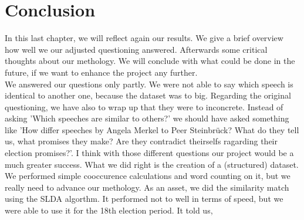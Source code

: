 \documentclass[12pt,paper=a4,nenglish]{scrreprt}
\begin{document}
\chapter{Conclusion}
In this last chapter, we will reflect again our results. We give a brief
overview how well we our adjusted questioning answered. Afterwards some critical
thoughts about our methology. We will conclude with what could be done in the
future, if we want to enhance the project any further.\\
We answered our questions only partly. We were not able to say which speech is
identical to another one, because the dataset was to big. 
Regarding the original questioning, we have also to wrap up that they were 
to inconcrete. Instead of asking 'Which speeches are similar to others?' we should have asked something like 'How differ speeches by Angela Merkel to Peer
Steinbrück? What do they tell us, what promises they make? Are they contradict
theirselfs ragarding their election promises?'. I think with those different
questions our project would be a much greater success. What we did right is the creation of a
(structured) dataset. We performed simple cooccurence calculations and word
counting on it, but we really need to advance our methology. As an asset, we
did the similarity match using the SLDA algorthm. It performed not to well in
terms of speed, but we were able to use it for the 18th election period. It told
us, 





\end{document}
